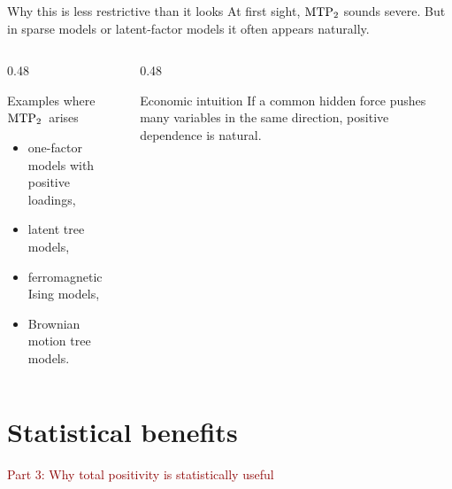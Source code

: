 \documentclass[dvipsnames,aspectratio=169,handout]{beamer}
\begin{document}
\begin{frame}{Why this is less restrictive than it looks}
At first sight, ${\rm MTP}_{2}$ sounds severe.
But in sparse models or latent-factor models it often appears naturally.

\begin{columns}[T]
\begin{column}{0.48\textwidth}
\begin{block}{Examples where ${\rm MTP}_{2}$\ arises}
\begin{itemize}
    \item one-factor models with positive loadings,
    \item latent tree models,
    \item ferromagnetic Ising models,
    \item Brownian motion tree models.
\end{itemize}
\end{block}
\end{column}
\begin{column}{0.48\textwidth}
\begin{block}{Economic intuition}
If a common hidden force pushes many variables in the same direction, positive dependence is natural.
\end{block}
\end{column}
\end{columns}
\end{frame}


\section{Statistical benefits}

\begin{frame}{}
\begin{center}
{\Huge \textcolor{DarkRed}{Part 3: Why total positivity is statistically useful}}
\end{center}
\end{frame}
\end{document}
